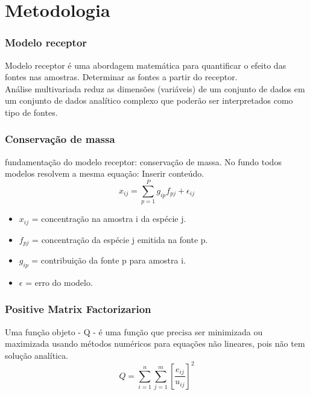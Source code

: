 \section{Metodologia}

\begin{frame}
  \frametitle{Modelo receptor}
  Modelo receptor é uma abordagem matemática para quantificar o efeito das fontes 
  nas amostras. Determinar as fontes a partir do receptor. \\
  Análise multivariada reduz as dimensões (variáveis) de um conjunto de dados 
  em um conjunto de dados analítico complexo que poderão ser interpretados como 
  tipo de fontes.
\end{frame}

\begin{frame}
  \frametitle{Conservação de massa}
  fundamentação do modelo receptor: conservação de massa. No fundo todos modelos resolvem a mesma equação: 
  Inserir conteúdo.
  \begin{equation}
    x_{ij} = \sum_{p=1}^{P} g_{ip}f_{pj} + \epsilon_{ij}
  \end{equation} 
 
  \begin{itemize}
    \item $x_{ij}$ = concentração na amostra i da espécie j.
    \item $f_{pj}$ = concentração da espécie j emitida na fonte p. 
    \item $g_{ip}$ = contribuição da fonte p para amostra i. 
    \item $\epsilon$ = erro do modelo.
  \end{itemize}
\end{frame}

\begin{frame}
  \frametitle{Positive Matrix Factorizarion}
  Uma função objeto - Q -  é uma função que precisa ser minimizada 
  ou maximizada usando métodos numéricos para equações não lineares, pois não 
  tem solução analítica. 
  \begin{equation}
    Q = \sum_{i=1}^n \sum_{j=1}^m  \left[ \frac{e_{ij}} {u_{ij}} \right] ^2
  \end{equation}
\end{frame}

